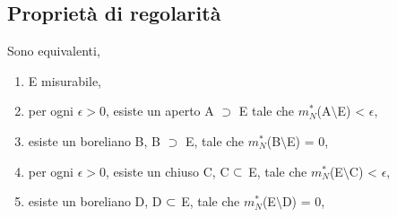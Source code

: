 \documentclass[Completo.tex]{subfiles}
\begin{document}
\subsection{Proprietà di regolarità}
\begin{eTh}
	Sono equivalenti,
	\begin{enumerate}
		\item E misurabile,
		\item per ogni $\epsilon > 0$, esiste un aperto A $\supset$ E tale che $m_N^{*}$(A$\setminus$E) < $\epsilon$,
		\item esiste un boreliano B, B $\supset$ E, tale che $m_N^{*}$(B$\setminus$E) = 0,
		\item per ogni $\epsilon > 0$, esiste un chiuso C, C $\subset$ E, tale che $m_N^{*}$(E$\setminus$C) < $\epsilon$,
		\item esiste un boreliano D, D $\subset$ E, tale che $m_N^{*}$(E$\setminus$D) = 0,
	\end{enumerate}
\end{eTh}
\end{document}
